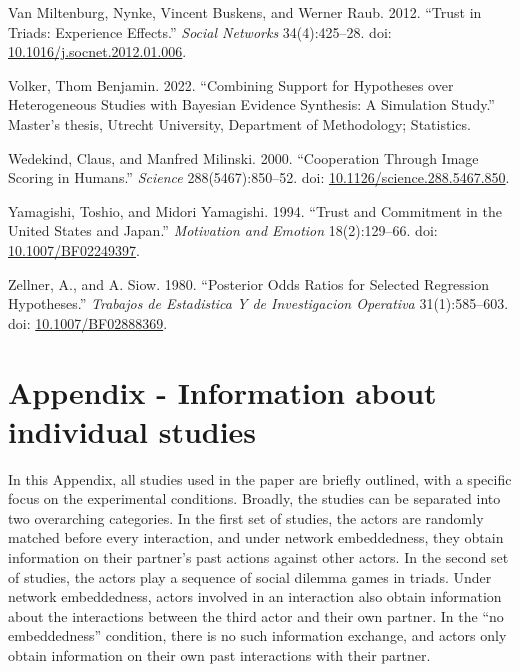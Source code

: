 \documentclass[
  11pt,
]{article}
\newlength{\cslhangindent}
\newlength{\cslentryspacingunit} %
\newenvironment{CSLReferences}[2] %
 {%
  \setlength{\parindent}{0pt}
  \ifodd #1
  \let\oldpar\par
  \def\par{\hangindent=\cslhangindent\oldpar}
  \fi
  \setlength{\parskip}{#2\cslentryspacingunit}
 }%
 {}
\begin{document}
\begin{CSLReferences}{1}{0}
\leavevmode{}%
Van Miltenburg, Nynke, Vincent Buskens, and Werner Raub. 2012. {``Trust in Triads: Experience Effects.''} \emph{Social Networks} 34(4):425--28. doi: \href{https://doi.org/10.1016/j.socnet.2012.01.006}{10.1016/j.socnet.2012.01.006}.

\leavevmode{}%
Volker, Thom Benjamin. 2022. {``Combining Support for Hypotheses over Heterogeneous Studies with Bayesian Evidence Synthesis: A Simulation Study.''} Master's thesis, Utrecht University, Department of Methodology; Statistics.

\leavevmode{}%
Wedekind, Claus, and Manfred Milinski. 2000. {``Cooperation Through Image Scoring in Humans.''} \emph{Science} 288(5467):850--52. doi: \href{https://doi.org/10.1126/science.288.5467.850}{10.1126/science.288.5467.850}.

\leavevmode{}%
Yamagishi, Toshio, and Midori Yamagishi. 1994. {``Trust and Commitment in the {U}nited {S}tates and {J}apan.''} \emph{Motivation and Emotion} 18(2):129--66. doi: \href{https://doi.org/10.1007/BF02249397}{10.1007/BF02249397}.

\leavevmode{}%
Zellner, A., and A. Siow. 1980. {``Posterior Odds Ratios for Selected Regression Hypotheses.''} \emph{Trabajos de Estadistica Y de Investigacion Operativa} 31(1):585--603. doi: \href{https://doi.org/10.1007/BF02888369}{10.1007/BF02888369}.

\end{CSLReferences}

\newpage

\appendix

\hypertarget{AppA}{%
\section{Appendix - Information about individual studies}\label{AppA}}

\setlength{\parindent}{0.2in}
\setlength{\leftskip}{0in}

\noindent

In this Appendix, all studies used in the paper are briefly outlined, with a specific focus on the experimental conditions.
Broadly, the studies can be separated into two overarching categories.
In the first set of studies, the actors are randomly matched before every interaction, and under network embeddedness, they obtain information on their partner's past actions against other actors.
In the second set of studies, the actors play a sequence of social dilemma games in triads.
Under network embeddedness, actors involved in an interaction also obtain information about the interactions between the third actor and their own partner. In the ``no embeddedness'' condition, there is no such information exchange, and actors only obtain information on their own past interactions with their partner.
\end{document}
